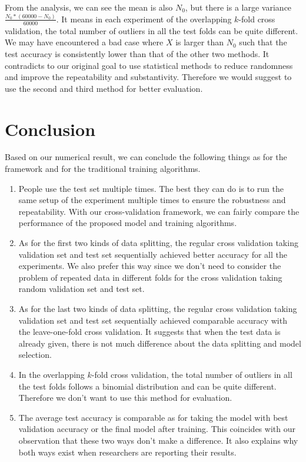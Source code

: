 From the analysis, we can see the mean is also  $N_0$, but there is a large variance $\frac{N_0*(60000-N_0)}{60000}$. It means in each experiment of the overlapping $k$-fold cross validation, the total number of outliers in all the test folds can be quite different. We may have encountered a bad case where $X$ is larger than $N_0$ such that the test accuracy is consistently lower than that of the other two methods. It contradicts to our original goal to use statistical methods to reduce randomness and improve the repeatability and substantivity. Therefore we would suggest to use the second and third method for better evaluation.



\section{Conclusion}
Based on our numerical result, we can conclude the following things as for the framework and for the traditional training algorithms.

\begin{enumerate}
\item People use the test set multiple times. The best they can do is to run the same setup of the experiment multiple times to ensure the robustness and repeatability. With our cross-validation framework, we can fairly compare the performance of the proposed model and training algorithms.
\item As for the first two kinds of data splitting, the regular cross validation taking validation set and test set sequentially achieved better accuracy for all the experiments. We also prefer this way since we don't need to consider the problem of repeated data in different folds for the cross validation taking random validation set and test set. 
\item As for the last two kinds of data splitting, the regular cross validation taking validation set and test set sequentially achieved comparable  accuracy with the leave-one-fold cross validation. It suggests that when the test data is already given, there is not much difference about the data splitting and model selection. 
\item In the overlapping $k$-fold cross validation, the total number of outliers in all the test folds follows a binomial distribution and can be quite different. Therefore we don't want to use this method for evaluation.
\item The average test accuracy is comparable as for taking the model with best validation accuracy or the final model after training. This coincides with our observation that these two ways don't make a difference. It also explains why both ways exist when researchers are reporting their results. 
\end{enumerate}



